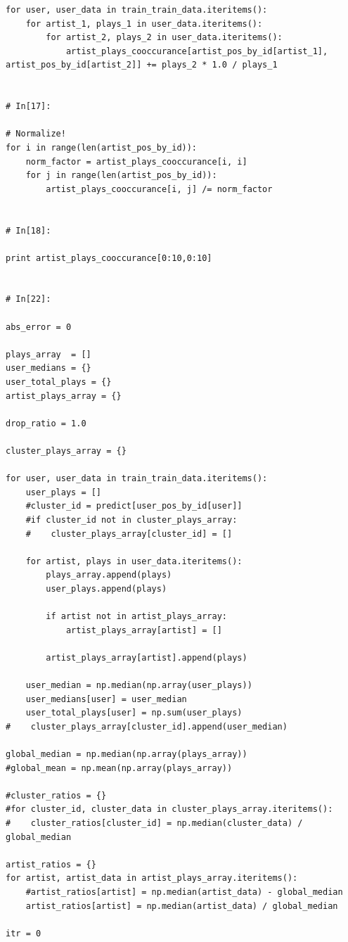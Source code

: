 \documentclass[11pt]{article}
\begin{document}
\begin{lstlisting}
for user, user_data in train_train_data.iteritems():
    for artist_1, plays_1 in user_data.iteritems():
        for artist_2, plays_2 in user_data.iteritems():
            artist_plays_cooccurance[artist_pos_by_id[artist_1], artist_pos_by_id[artist_2]] += plays_2 * 1.0 / plays_1


# In[17]:

# Normalize!
for i in range(len(artist_pos_by_id)):
    norm_factor = artist_plays_cooccurance[i, i]
    for j in range(len(artist_pos_by_id)):
        artist_plays_cooccurance[i, j] /= norm_factor


# In[18]:

print artist_plays_cooccurance[0:10,0:10]


# In[22]:

abs_error = 0

plays_array  = []
user_medians = {}
user_total_plays = {}
artist_plays_array = {}

drop_ratio = 1.0

cluster_plays_array = {}

for user, user_data in train_train_data.iteritems():
    user_plays = []
    #cluster_id = predict[user_pos_by_id[user]]
    #if cluster_id not in cluster_plays_array:
    #    cluster_plays_array[cluster_id] = []
    
    for artist, plays in user_data.iteritems():
        plays_array.append(plays)
        user_plays.append(plays)
        
        if artist not in artist_plays_array:
            artist_plays_array[artist] = []
        
        artist_plays_array[artist].append(plays)
        
    user_median = np.median(np.array(user_plays))
    user_medians[user] = user_median
    user_total_plays[user] = np.sum(user_plays)
#    cluster_plays_array[cluster_id].append(user_median)
    
global_median = np.median(np.array(plays_array))
#global_mean = np.mean(np.array(plays_array))

#cluster_ratios = {}
#for cluster_id, cluster_data in cluster_plays_array.iteritems():
#    cluster_ratios[cluster_id] = np.median(cluster_data) / global_median

artist_ratios = {}
for artist, artist_data in artist_plays_array.iteritems():
    #artist_ratios[artist] = np.median(artist_data) - global_median
    artist_ratios[artist] = np.median(artist_data) / global_median
    
itr = 0
    

\end{lstlisting}
\end{document}
